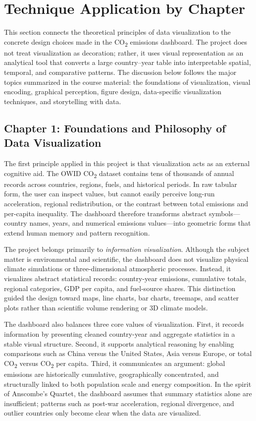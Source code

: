 \documentclass[a4paper,12pt]{article}
\begin{document}
\section{Technique Application by Chapter}
This section connects the theoretical principles of data visualization to the concrete
design choices made in the CO\textsubscript{2} emissions dashboard. The project does not
treat visualization as decoration; rather, it uses visual representation as an analytical
tool that converts a large country--year table into interpretable spatial, temporal, and
comparative patterns. The discussion below follows the major topics summarized in the
course material: the foundations of visualization, visual encoding, graphical perception,
figure design, data-specific visualization techniques, and storytelling with data.

\subsection{Chapter 1: Foundations and Philosophy of Data Visualization}

The first principle applied in this project is that visualization acts as an external
cognitive aid. The OWID CO\textsubscript{2} dataset contains tens of thousands of annual
records across countries, regions, fuels, and historical periods. In raw tabular form,
the user can inspect values, but cannot easily perceive long-run acceleration, regional
redistribution, or the contrast between total emissions and per-capita inequality.
The dashboard therefore transforms abstract symbols---country names, years, and numerical
emissions values---into geometric forms that extend human memory and pattern recognition.

The project belongs primarily to \textit{information visualization}. Although the subject
matter is environmental and scientific, the dashboard does not visualize physical climate
simulations or three-dimensional atmospheric processes. Instead, it visualizes abstract
statistical records: country-year emissions, cumulative totals, regional categories, GDP
per capita, and fuel-source shares. This distinction guided the design toward maps, line
charts, bar charts, treemaps, and scatter plots rather than scientific volume rendering or
3D climate models.

The dashboard also balances three core values of visualization. First, it records
information by presenting cleaned country-year and aggregate statistics in a stable
visual structure. Second, it supports analytical reasoning by enabling comparisons such
as China versus the United States, Asia versus Europe, or total CO\textsubscript{2} versus
CO\textsubscript{2} per capita. Third, it communicates an argument: global emissions are
historically cumulative, geographically concentrated, and structurally linked to both
population scale and energy composition. In the spirit of Anscombe's Quartet, the
dashboard assumes that summary statistics alone are insufficient; patterns such as
post-war acceleration, regional divergence, and outlier countries only become clear when
the data are visualized.
\end{document}
